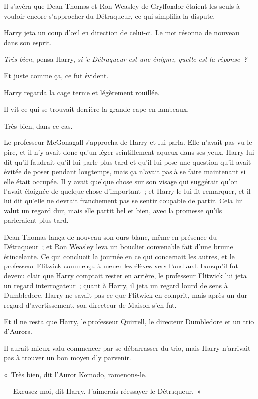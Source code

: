 Il s'avéra que Dean Thomas et Ron Weasley de Gryffondor étaient les seuls à vouloir encore s'approcher du Détraqueur, ce qui simplifia la dispute.

Harry jeta un coup d'œil en direction de celui-ci.
Le mot résonna de nouveau dans son esprit.

\emph{Très bien}, pensa Harry, \emph{si le Détraqueur est une énigme, quelle est la réponse~?}

Et juste comme ça, ce fut évident.

Harry regarda la cage ternie et légèrement rouillée.

Il vit ce qui se trouvait derrière la grande cape en lambeaux.

Très bien, dans ce cas.

Le professeur McGonagall s'approcha de Harry et lui parla.
Elle n'avait pas vu le pire, et il n'y avait donc qu'un léger scintillement aqueux dans ses yeux.
Harry lui dit qu'il faudrait qu'il lui parle plus tard et qu'il lui pose une question qu'il avait évitée de poser pendant longtemps, mais ça n'avait pas à se faire maintenant si elle était occupée.
Il y avait quelque chose sur son visage qui suggérait qu'on l'avait éloignée de quelque chose d'important~; et Harry le lui fit remarquer, et il lui dit qu'elle ne devrait franchement pas se sentir coupable de partir.
Cela lui valut un regard dur, mais elle partit bel et bien, avec la promesse qu'ils parleraient plus tard.

Dean Thomas lança de nouveau son ours blanc, même en présence du Détraqueur~; et Ron Weasley leva un bouclier convenable fait d'une brume étincelante.
Ce qui concluait la journée en ce qui concernait les autres, et le professeur Flitwick commença à mener les élèves vers Poudlard.
Lorsqu'il fut devenu clair que Harry comptait rester en arrière, le professeur Flitwick lui jeta un regard interrogateur~; quant à Harry, il jeta un regard lourd de sens à Dumbledore.
Harry ne savait pas ce que Flitwick en comprit, mais après un dur regard d'avertissement, son directeur de Maison s'en fut.

Et il ne resta que Harry, le professeur Quirrell, le directeur Dumbledore et un trio d'Aurors.

Il aurait mieux valu commencer par se débarrasser du trio, mais Harry n'arrivait pas à trouver un bon moyen d'y parvenir.

«~Très bien, dit l'Auror Komodo, ramenons-le.

--- Excusez-moi, dit Harry.
J'aimerais réessayer le Détraqueur.~»

